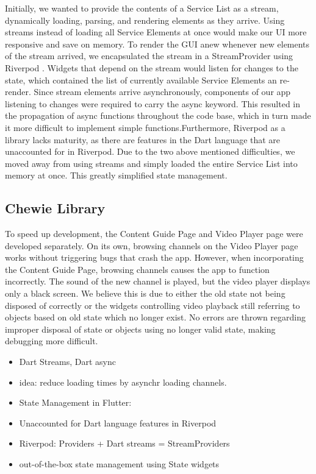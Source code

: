 \documentclass[conference]{IEEEtran}
\begin{document}
Initially, we wanted to provide the contents of a Service List as a stream, dynamically loading, parsing, and rendering elements as they arrive.
Using streams instead of loading all Service Elements at once would make our UI more responsive and save on memory.
To render the GUI anew whenever new elements of the stream arrived, we encapsulated the stream in a StreamProvider using Riverpod \cite{RiverPod}. Widgets that depend on the stream would listen for changes to the state, which contained the list of currently available Service Elements an re-render. Since stream elements arrive asynchronously, components of our app listening to changes were required to carry the async keyword. This resulted in the propagation of async functions throughout the code base, which in turn made it more difficult to implement simple functions.Furthermore, Riverpod as a library lacks maturity, as there are features in the Dart language that are unaccounted for in Riverpod. Due to the two above mentioned difficulties, we moved away from using streams and simply loaded the entire Service List into memory at once. This greatly simplified state management.

\subsection{Chewie Library} 
To speed up development, the Content Guide Page and Video Player page were developed separately. On its own, browsing channels on the Video Player page works without triggering bugs that crash the app. However, when incorporating the Content Guide Page, browsing channels causes the app to function incorrectly. The sound of the new channel is played, but the video player displays only a black screen. We believe this is due to either the old state not being disposed of correctly or the widgets controlling video playback still referring to objects based on old state which no longer exist. No errors are thrown regarding improper disposal  of state or objects using no longer valid state, making debugging more difficult.

\begin{itemize}
	\item Dart Streams, Dart async
	\item idea: reduce loading times by asynchr loading channels. 
	\item State Management in Flutter: 
	\item Unaccounted for Dart language features in Riverpod
	\item Riverpod: Providers + Dart streams = StreamProviders
	\item out-of-the-box state management using State widgets
\end{itemize}	
\end{document}
